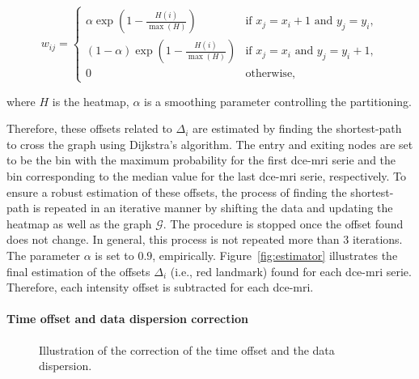 \begin{equation}
  w_{ij} = \begin{cases}
    \alpha \exp(1 - \frac{H(i)}{\max(H)})       & \text{if } x_j = x_i + 1 \text{ and } y_j = y_i, \\
    (1 - \alpha) \exp(1 - \frac{H(i)}{\max(H)}) & \text{if } x_j = x_i \text{ and } y_j = y_i + 1, \\
    0                                           & \text{otherwise},
  \end{cases}
  \label{eq:weight}
\end{equation}

\noindent where $H$ is the heatmap, $\alpha$ is a smoothing parameter controlling the partitioning.

Therefore, these offsets related to $\Delta_i$ are estimated by finding the shortest-path to cross the graph using Dijkstra's algorithm.
The entry and exiting nodes are set to be the bin with the maximum probability for the first \ac{dce}-\ac{mri} serie and the bin corresponding to the median value for the last \ac{dce}-\ac{mri} serie, respectively.
To ensure a robust estimation of these offsets, the process of finding the shortest-path is repeated in an iterative manner by shifting the data and updating the heatmap as well as the graph $\mathcal{G}$.
The procedure is stopped once the offset found does not change.
In general, this process is not repeated more than 3 iterations.
The parameter $\alpha$ is set to $0.9$, empirically.
Figure~\ref{fig:estimator} illustrates the final estimation of the offsets $\Delta_i$ (i.e., red landmark) found for each \ac{dce}-\ac{mri} serie.
Therefore, each intensity offset is subtracted for each \ac{dce}-\ac{mri}.

\paragraph{Time offset and data dispersion correction}\label{par:chp5:DCE-norm:time-off}

\begin{figure}
  \centering
  \hspace*{\fill}
   \hfill
  \hspace*{\fill}
  \caption{Illustration of the correction of the time offset and the data dispersion.}
  \label{fig:curveal}
\end{figure}

